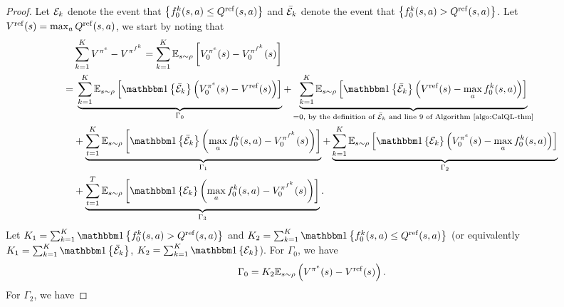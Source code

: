 \begin{proof}
    \label{proof:CalQL-main-thm}
    Let $\mathcal E_k $ denote the event that $\left\{ f_0^k(s,a)\leq Q^\mathrm{ref}(s,a) \right\}$ and $\bar{\mathcal E}_k $ denote the event that $\left\{ f_0^k(s,a) > Q^\mathrm{ref}(s,a) \right\}$. Let $V^\mathrm{ref}(s) = \max_aQ^\mathrm{ref}(s,a)$, we start by noting that
\begin{equation}
    \label{eq:conservative-main-thm-derivation0}
    \begin{split}
        &\sum_{k=1}^KV^{\pi^e}-V^{\pi^{f^k}} = \sum_{k=1}^K\bb E_{s\sim\rho}\brac{V_0^{\pi^e}(s)-V^{\pi^{f^k}}_0(s)}\\
        =&\;\underbrace{\sum_{k=1}^K\bb E_{s\sim\rho}\brac{\indicator{\bar{\mc E}_k}\paren{V_0^{\pi^e}(s)-V^{\mr{ref}}(s)}}}_{\Gamma_0}+\underbrace{\sum_{k=1}^K\bb E_{s\sim\rho}\brac{\indicator{\bar{\mc E}_k}\paren{V^{\mr{ref}}(s)-\max_a f_0^k(s,a)}}}_{=0, \text{ by the definition of }\bar{\mc E}_k\text{ and line 9 of Algorithm~\ref{algo:CalQL-thm}}}\\
        &+\underbrace{\sum_{t=1}^K\bb E_{s\sim\rho}\brac{\indicator{\bar{\mc E}_k}\paren{\max_a f_0^k(s,a)-V^{\pi^{f^k}}_0(s)}}}_{\Gamma_1}+\underbrace{\sum_{k=1}^K\bb E_{s\sim\rho}\brac{\indicator{{\mc E}_k}\paren{V_0^{\pi^e}(s)-\max_a f_0^k(s,a)}}}_{\Gamma_2}\\
        &+\underbrace{\sum_{t=1}^T\bb E_{s\sim\rho}\brac{\indicator{{\mc E}_k}\paren{\max_a f_0^k(s,a)-V^{\pi^{f^k}}_0(s)}}}_{\Gamma_3}.\\
    \end{split}
\end{equation}
Let $K_1 = \sum_{k=1}^K\indicator{f_0^k(s,a)>Q^\mr{ref}(s,a)}$ and $K_2 = \sum_{k=1}^K\indicator{f_0^k(s,a)\leq Q^\mr{ref}(s,a)}$ (or equivalently $K_1 = \sum_{k=1}^K\indicator{\bar{\mc E}_k}$, $K_2=\sum_{k=1}^K\indicator{{\mc E}_k}$). For $\Gamma_0$, we have
\begin{equation}
    \label{eq:derivation_gamma0}
    \Gamma_0 = K_2\mathbb E_{s\sim\rho}\left( V^{\pi^e}(s)-V^{\mathrm{ref}}(s) \right).
\end{equation}
For $\Gamma_2$, we have 


\end{proof}
